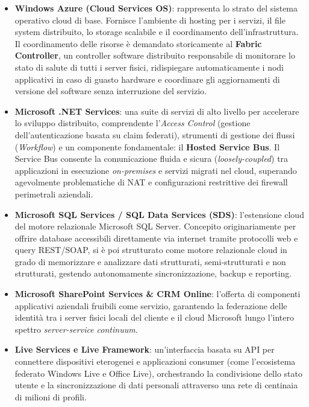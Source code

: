 \documentclass[11pt, a4paper]{article}
\begin{document}
\begin{itemize}
    \item \textbf{Windows Azure (Cloud Services OS)}: rappresenta lo strato del sistema operativo cloud di base. Fornisce l'ambiente di hosting per i servizi, il file system distribuito, lo storage scalabile e il coordinamento dell'infrastruttura. Il coordinamento delle risorse è demandato storicamente al \textbf{Fabric Controller}, un controller software distribuito responsabile di monitorare lo stato di salute di tutti i server fisici, ridispiegare automaticamente i nodi applicativi in caso di guasto hardware e coordinare gli aggiornamenti di versione del software senza interruzione del servizio.
    \item \textbf{Microsoft .NET Services}: una suite di servizi di alto livello per accelerare lo sviluppo distribuito, comprendente l'\emph{Access Control} (gestione dell'autenticazione basata su claim federati), strumenti di gestione dei flussi (\emph{Workflow}) e un componente fondamentale: il \textbf{Hosted Service Bus}. Il Service Bus consente la comunicazione fluida e sicura (\emph{loosely-coupled}) tra applicazioni in esecuzione \emph{on-premises} e servizi migrati nel cloud, superando agevolmente problematiche di NAT e configurazioni restrittive dei firewall perimetrali aziendali.
    \item \textbf{Microsoft SQL Services / SQL Data Services (SDS)}: l'estensione cloud del motore relazionale Microsoft SQL Server. Concepito originariamente per offrire database accessibili direttamente via internet tramite protocolli web e query REST/SOAP, si è poi strutturato come motore relazionale cloud in grado di memorizzare e analizzare dati strutturati, semi-strutturati e non strutturati, gestendo autonomamente sincronizzazione, backup e reporting.
    \item \textbf{Microsoft SharePoint Services \& CRM Online}: l'offerta di componenti applicativi aziendali fruibili come servizio, garantendo la federazione delle identità tra i server fisici locali del cliente e il cloud Microsoft lungo l'intero spettro \emph{server-service continuum}.
    \item \textbf{Live Services e Live Framework}: un'interfaccia basata su API per connettere dispositivi eterogenei e applicazioni consumer (come l'ecosistema federato Windows Live e Office Live), orchestrando la condivisione dello stato utente e la sincronizzazione di dati personali attraverso una rete di centinaia di milioni di profili.
\end{itemize}
\end{document}
